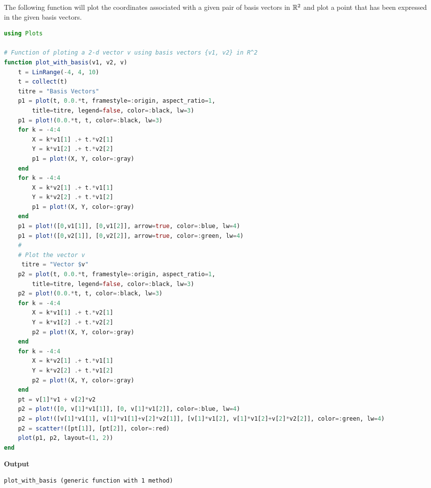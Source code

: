 The following function will plot the coordinates associated with a given pair of basis vectors in $\mathbb R^2$ and plot a point that has been expressed in the given basis vectors.\\

\begin{lstlisting}[language=Julia,style=mystyle]
using Plots

# Function of ploting a 2-d vector v using basis vectors {v1, v2} in R^2
function plot_with_basis(v1, v2, v)
    t = LinRange(-4, 4, 10)
    t = collect(t)
    titre = "Basis Vectors"
    p1 = plot(t, 0.0.*t, framestyle=:origin, aspect_ratio=1, 
        title=titre, legend=false, color=:black, lw=3)
    p1 = plot!(0.0.*t, t, color=:black, lw=3)
    for k = -4:4
        X = k*v1[1] .+ t.*v2[1]
        Y = k*v1[2] .+ t.*v2[2]
        p1 = plot!(X, Y, color=:gray)
    end
    for k = -4:4
        X = k*v2[1] .+ t.*v1[1]
        Y = k*v2[2] .+ t.*v1[2]
        p1 = plot!(X, Y, color=:gray)
    end
    p1 = plot!([0,v1[1]], [0,v1[2]], arrow=true, color=:blue, lw=4)
    p1 = plot!([0,v2[1]], [0,v2[2]], arrow=true, color=:green, lw=4)
    #
    # Plot the vector v
     titre = "Vector $v"
    p2 = plot(t, 0.0.*t, framestyle=:origin, aspect_ratio=1, 
        title=titre, legend=false, color=:black, lw=3)
    p2 = plot!(0.0.*t, t, color=:black, lw=3)
    for k = -4:4
        X = k*v1[1] .+ t.*v2[1]
        Y = k*v1[2] .+ t.*v2[2]
        p2 = plot!(X, Y, color=:gray)
    end
    for k = -4:4
        X = k*v2[1] .+ t.*v1[1]
        Y = k*v2[2] .+ t.*v1[2]
        p2 = plot!(X, Y, color=:gray)
    end
    pt = v[1]*v1 + v[2]*v2
    p2 = plot!([0, v[1]*v1[1]], [0, v[1]*v1[2]], color=:blue, lw=4)
    p2 = plot!([v[1]*v1[1], v[1]*v1[1]+v[2]*v2[1]], [v[1]*v1[2], v[1]*v1[2]+v[2]*v2[2]], color=:green, lw=4)
    p2 = scatter!([pt[1]], [pt[2]], color=:red)
    plot(p1, p2, layout=(1, 2))
end
\end{lstlisting}
\textbf{Output} 
\begin{verbatim}
plot_with_basis (generic function with 1 method)
\end{verbatim}

